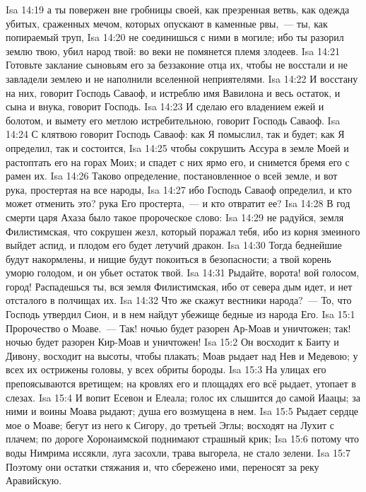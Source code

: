 \vs Isa 14:19 а ты повержен вне гробницы своей, как презренная ветвь, как одежда убитых, сраженных мечом, которых опускают в каменные рвы,~--- ты, как попираемый труп,
\vs Isa 14:20 не соединишься с ними в могиле; ибо ты разорил землю твою, убил народ твой: во веки не помянется племя злодеев.
\vs Isa 14:21 Готовьте заклание сыновьям его за беззаконие отца их, чтобы не восстали и не завладели землею и не наполнили вселенной неприятелями.
\vs Isa 14:22 И восстану на них, говорит Господь Саваоф, и истреблю имя Вавилона и весь остаток, и сына и внука, говорит Господь.
\vs Isa 14:23 И сделаю его владением ежей и болотом, и вымету его метлою истребительною, говорит Господь Саваоф.
\vs Isa 14:24 С клятвою говорит Господь Саваоф: как Я помыслил, так и будет; как Я определил, так и состоится,
\vs Isa 14:25 чтобы сокрушить Ассура в земле Моей и растоптать его на горах Моих; и спадет с них ярмо его, и снимется бремя его с рамен их.
\vs Isa 14:26 Таково определение, постановленное о всей земле, и вот рука, простертая на все народы,
\vs Isa 14:27 ибо Господь Саваоф определил, и кто может отменить это? рука Его простерта,~--- и кто отвратит ее?
\rsbpar\vs Isa 14:28 В год смерти царя Ахаза было такое пророческое слово:
\vs Isa 14:29 не радуйся, земля Филистимская, что сокрушен жезл, который поражал тебя, ибо из корня змеиного выйдет аспид, и плодом его будет летучий дракон.
\vs Isa 14:30 Тогда беднейшие будут накормлены, и нищие будут покоиться в безопасности; а твой корень уморю голодом, и он убьет остаток твой.
\vs Isa 14:31 Рыдайте, ворота! вой голосом, город! Распадешься ты, вся земля Филистимская, ибо от севера дым идет, и нет отсталого в полчищах их.
\vs Isa 14:32 Что же скажут вестники народа?~--- То, что Господь утвердил Сион, и в нем найдут убежище бедные из народа Его.
\vs Isa 15:1 Пророчество о Моаве.~--- Так! ночью будет разорен Ар-Моав и уничтожен; так! ночью будет разорен Кир-Моав и уничтожен!
\vs Isa 15:2 Он восходит к Баиту и Дивону, восходит на высоты, чтобы плакать; Моав рыдает над Нев и Медевою; у всех их острижены головы, у всех обриты бороды.
\vs Isa 15:3 На улицах его препоясываются вретищем; на кровлях его и площадях его всё рыдает, утопает в слезах.
\vs Isa 15:4 И вопит Есевон и Елеала; голос их слышится до самой Иаацы; за ними и воины Моава рыдают; душа его возмущена в нем.
\vs Isa 15:5 Рыдает сердце мое о Моаве; бегут из него к Сигору, до третьей Эглы; восходят на Лухит с плачем; по дороге Хоронаимской поднимают страшный крик;
\vs Isa 15:6 потому что воды Нимрима иссякли, луга засохли, трава выгорела, не стало зелени.
\vs Isa 15:7 Поэтому они остатки стяжания и, что сбережено ими, переносят за реку Аравийскую.
